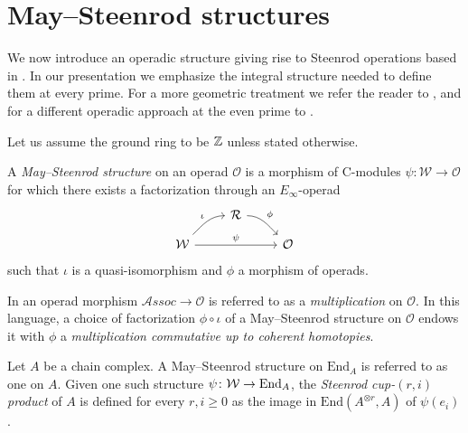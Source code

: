 
\section{May--Steenrod structures} \label{s:steenrod}

We now introduce an operadic structure giving rise to Steenrod operations based in \cite{may1970general}.
In our presentation we emphasize the integral structure needed to define them at every prime.
For a more geometric treatment we refer the reader to \cite{may1972geometry, may76homology, lawson2020dyerlashof}, and for a different operadic approach at the even prime to \cite{chataur2005adem-cartan}.

Let us assume the ground ring to be $\mathbb{Z}$ unless stated otherwise.
\begin{definition} \label{def: May--Steenrod structure}
	A \textit{May--Steenrod structure} on an operad $\mathcal O$ is a
	morphism of $\mathrm{C}$-modules $\psi \colon \mathcal W \to \mathcal O$ for which there exists a factorization through an $E_\infty$-operad
	\begin{equation*}
	\begin{tikzcd}[column sep = normal, row sep = small]
	& \mathcal R \arrow[dr, "\phi", out=0] & \\
	\mathcal W \arrow[ur, "\iota", in=180] \arrow[rr, "\psi"] & & \mathcal O
	\end{tikzcd}
	\end{equation*}
	such that $\iota$ is a quasi-isomorphism and $\phi$ a morphism of operads.
\end{definition}

\begin{remark} \label{rmk: Deligne conjecture}
	In \cite{GerstenhaberVoronov} an operad morphism $\mathcal{A}ssoc \to \mathcal O$ is referred to as a \textit{multiplication} on $\mathcal O$.
	In this language, a choice of factorization $\phi \circ \iota$ of a May--Steenrod structure on $\mathcal O$ endows it with $\phi$ a \textit{multiplication commutative up to coherent homotopies}.
\end{remark}

\begin{definition} \label{def: Steenrod products}
	Let $A$ be a chain complex.
	A May--Steenrod structure on $\mathrm{End}_A$ is referred to as one on $A$.
	Given one such structure $\psi \colon \mathcal W \to \mathrm{End}_A$, the \textit{Steenrod cup-}$(r, i)$ \textit{product} of $A$ is defined for every $r, i \geq 0$ as the image in $ \mathrm{End}(A^{\otimes r}, A)$ of $\psi(e_i)$.
\end{definition}

